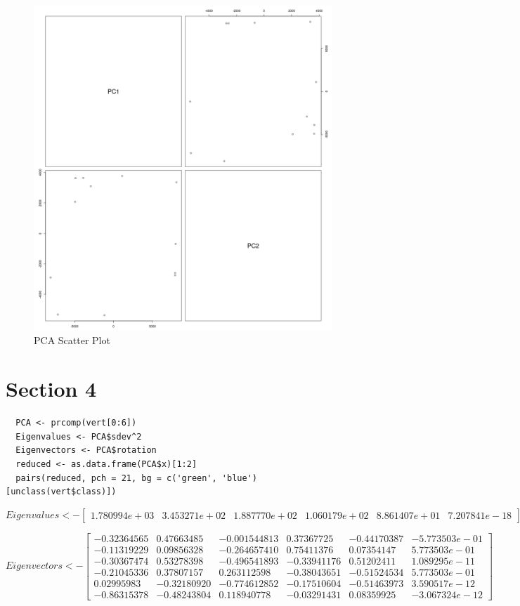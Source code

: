 \documentclass{report}
\begin{document}
\begin{figure}[h!]
	\includegraphics[width=\linewidth]{pca_scatter_plot.png}
	 \caption{PCA Scatter Plot}
	\label{fig:PCA Scatter Plot}
\end{figure}

\chapter{Section 4}

\begin{verbatim}	
  PCA <- prcomp(vert[0:6])
  Eigenvalues <- PCA$sdev^2
  Eigenvectors <- PCA$rotation
  reduced <- as.data.frame(PCA$x)[1:2]
  pairs(reduced, pch = 21, bg = c('green', 'blue')[unclass(vert$class)])
\end{verbatim}

\[
  Eigenvalues <- 
  \begin{bmatrix}
    1.780994e+03 & 3.453271e+02 & 1.887770e+02 & 1.060179e+02 & 8.861407e+01 & 7.207841e-18
  \end{bmatrix}
\]

\[
  Eigenvectors <- 
  \begin{bmatrix}
    -0.32364565 & 0.47663485 & -0.001544813 & 0.37367725 & -0.44170387 & -5.773503e-01 \\
    -0.11319229 & 0.09856328 & -0.264657410 & 0.75411376 & 0.07354147  & 5.773503e-01 \\
    -0.30367474 & 0.53278398 & -0.496541893 & -0.33941176 & 0.51202411 & 1.089295e-11 \\
    -0.21045336 & 0.37807157 & 0.263112598 & -0.38043651 & -0.51524534 & 5.773503e-01 \\
    0.02995983 & -0.32180920 & -0.774612852 & -0.17510604 & -0.51463973 & 3.590517e-12 \\
    -0.86315378 & -0.48243804 & 0.118940778 & -0.03291431 & 0.08359925 & -3.067324e-12
  \end{bmatrix}
\]
\end{document}
